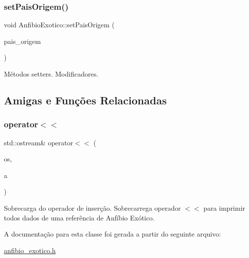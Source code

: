 \subsubsection{\texorpdfstring{set\+Pais\+Origem()}{setPaisOrigem()}}
{\footnotesize\ttfamily void Anfibio\+Exotico\+::set\+Pais\+Origem (\begin{DoxyParamCaption}\item[{std\+::string}]{pais\+\_\+origem }\end{DoxyParamCaption})}

Métodos setters. Modificadores. 

\subsection{Amigas e Funções Relacionadas}
\mbox{\label{classAnfibioExotico_a507427d0ea4ae82dfbf7aefba2d1502c}} 
\subsubsection{\texorpdfstring{operator$<$$<$}{operator<<}}
{\footnotesize\ttfamily std\+::ostream\& operator$<$$<$ (\begin{DoxyParamCaption}\item[{std\+::ostream \&}]{os,  }\item[{\hyperlink{classAnfibioExotico}{Anfibio\+Exotico} \&}]{a }\end{DoxyParamCaption})\hspace{0.3cm}{\ttfamily [friend]}}

Sobrecarga do operador de inserção. Sobrecarrega operador $<$$<$ para imprimir todos dados de uma referência de Anfíbio Exótico. 

A documentação para esta classe foi gerada a partir do seguinte arquivo\+:\begin{DoxyCompactItemize}
\item 
\hyperlink{anfibio__exotico_8h}{anfibio\+\_\+exotico.\+h}\end{DoxyCompactItemize}
